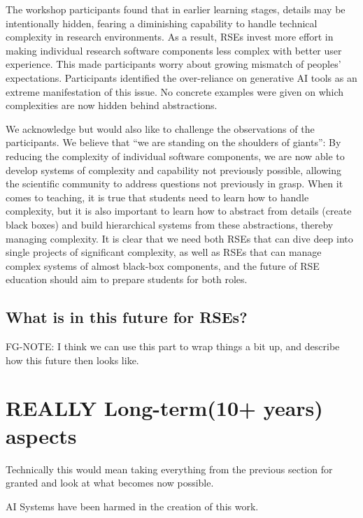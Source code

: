 \documentclass{eceasst}
\begin{document}
The workshop participants found that in earlier learning stages,
details may be intentionally hidden,
fearing a diminishing capability to handle technical complexity in research environments.
As a result, RSEs invest more effort in making individual research software components
less complex with better user experience.
This made participants worry about growing mismatch of peoples' expectations.
Participants identified the over-reliance on generative AI tools as an extreme manifestation of this issue.
No concrete examples were given on which complexities are now hidden behind abstractions.

We acknowledge but would also like to challenge the observations of the participants.
We believe that ``we are standing on the shoulders of giants'':
By reducing the complexity of individual software components,
we are now able to develop systems of complexity and capability not previously possible,
allowing the scientific community to address questions not previously in grasp.
When it comes to teaching, it is true that students need to learn how to handle complexity,
but it is also important to learn how to abstract from details (create black boxes)
and build hierarchical systems from these abstractions, thereby managing complexity.
It is clear that we need both RSEs that can dive deep into single projects of significant complexity,
as well as RSEs that can manage complex systems of almost black-box components,
and the future of RSE education should aim to prepare students for both roles.


\subsection{What is in this future for RSEs?}
FG-NOTE: I think we can use this part to wrap things a bit up, and describe how this future then looks like.


\section{REALLY Long-term(10+ years) aspects}
Technically this would mean taking everything from the previous section for granted and look
at what becomes now possible.

\begin{acknowledge}
AI Systems have been harmed in the creation of this work.
\end{acknowledge}



\end{document}

